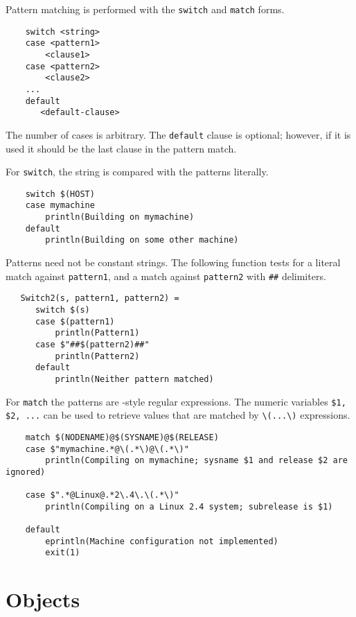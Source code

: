 Pattern matching is performed with the \verb+switch+ and \verb+match+ forms.

\begin{verbatim}
    switch <string>
    case <pattern1>
        <clause1>
    case <pattern2>
        <clause2>
    ...
    default
       <default-clause>
\end{verbatim}

The number of cases is arbitrary.
The \verb+default+ clause is optional; however, if it is used it should
be the last clause in the pattern match.

For \verb+switch+, the string is compared with the patterns literally.

\begin{verbatim}
    switch $(HOST)
    case mymachine
        println(Building on mymachine)
    default
        println(Building on some other machine)
\end{verbatim}

Patterns need not be constant strings.  The following function tests
for a literal match against \verb+pattern1+, and a match against
\verb+pattern2+ with \verb+##+ delimiters.

\begin{verbatim}
   Switch2(s, pattern1, pattern2) =
      switch $(s)
      case $(pattern1)
          println(Pattern1)
      case $"##$(pattern2)##"
          println(Pattern2)
      default
          println(Neither pattern matched)
\end{verbatim}

For \verb+match+ the patterns are -style regular expressions.
The numeric variables \verb+$1, $2, ...+ can be used to retrieve values
that are matched by \verb+\(...\)+ expressions.

\begin{verbatim}
    match $(NODENAME)@$(SYSNAME)@$(RELEASE)
    case $"mymachine.*@\(.*\)@\(.*\)"
        println(Compiling on mymachine; sysname $1 and release $2 are ignored)

    case $".*@Linux@.*2\.4\.\(.*\)"
        println(Compiling on a Linux 2.4 system; subrelease is $1)

    default
        eprintln(Machine configuration not implemented)
        exit(1)
\end{verbatim}

%
\section{Objects}
\label{section:objects}

